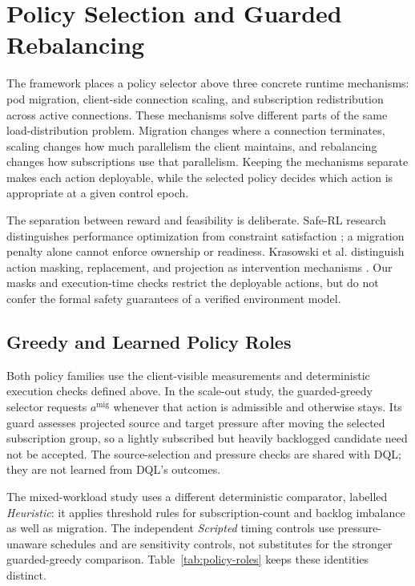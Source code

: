\section{Policy Selection and Guarded Rebalancing}
The framework places a policy selector above three concrete runtime mechanisms:
pod migration, client-side connection scaling, and subscription redistribution
across active connections. These mechanisms solve different parts of the same
load-distribution problem. Migration changes where a connection terminates,
scaling changes how much parallelism the client maintains, and rebalancing
changes how subscriptions use that parallelism. Keeping the mechanisms
separate makes each action deployable, while the selected policy decides which
action is appropriate at a given control epoch.

The separation between reward and feasibility is deliberate. Safe-RL research
distinguishes performance optimization from constraint satisfaction
\cite{Gu2024SafeRL}; a migration penalty alone cannot enforce ownership or
readiness. Krasowski et al. distinguish action masking, replacement, and
projection as intervention mechanisms \cite{Krasowski2023ProvablySafe}.
Our masks and execution-time checks restrict the deployable actions, but do
not confer the formal safety guarantees of a verified environment model.

\subsection{Greedy and Learned Policy Roles}
Both policy families use the client-visible measurements and deterministic
execution checks defined above. In the scale-out study, the guarded-greedy
selector requests $a^{\mathrm{mig}}$ whenever that action is admissible and
otherwise stays. Its guard assesses projected source and target pressure
after moving the selected subscription group, so a lightly subscribed but
heavily backlogged candidate need not be accepted. The source-selection and
pressure checks are shared with DQL; they are not learned from DQL's outcomes.

The mixed-workload study uses a different deterministic comparator, labelled
\emph{Heuristic}: it applies threshold rules for subscription-count and backlog
imbalance as well as migration. The independent \emph{Scripted} timing controls
use pressure-unaware schedules and are sensitivity controls, not substitutes
for the stronger guarded-greedy comparison. Table~\ref{tab:policy-roles}
keeps these identities distinct.


